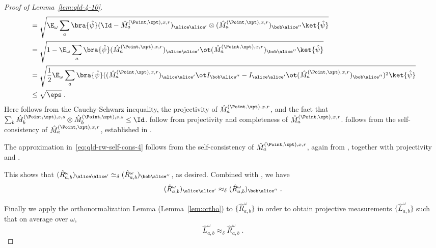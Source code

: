 \begin{proof}[Proof of Lemma~\ref{lem:qld-4-10}]
\begin{align}
                &= \sqrt{\E_\omega \sum_{a} \bra{\hat{\psi}} (\Id - \hat{M}^{(\Point,\xpt),x,r}_{a})_{\alice \alice'} \otimes (\hat{M}^{(\Point,\xpt),x,r}_{a})_{\bob \alice''} \ket{\hat{\psi}}} \label{eq:qld-rw-self-cons-3-2}\\
                &= \sqrt{ 1 - \E_{\omega} \sum_a \bra{\hat{\psi}} (\hat{M}^{(\Point,\xpt),x,r}_{a})_{\alice \alice'} \ot  (\hat{M}^{(\Point,\xpt),x,r}_{a})_{\bob \alice''} \ket{\hat{\psi}}} \label{eq:qld-rw-self-cons-3-3}\\
                &=\sqrt{ \frac{1}{2} \E_{\omega} \sum_a \bra{\hat{\psi}} ( (\hat{M}^{(\Point,\xpt),x,r}_{a})_{\alice \alice'} \ot I_{\bob \alice''} - I_{\alice \alice'} \ot  (\hat{M}^{(\Point,\xpt),x,r}_{a})_{\bob \alice''})^2 \ket{\hat{\psi}}} \label{eq:qld-rw-self-cons-3-4}\\
		&\leq \sqrt{\eps}\;. \label{eq:qld-rw-self-cons-3-5}
	\end{align}
	Here  follows from the Cauchy-Schwarz inequality, the projectivity of $\hat{M}^{(\Point,\xpt),x,r}_{a}$, and the fact that $\sum_b \hat{M}^{(\Point,\zpt),z,s}_{b} \otimes \hat{M}^{(\Point,\zpt),z,s}_{b} \leq \Id$.  follow from projectivity and completeness of $\hat{M}^{(\Point, \xpt), x, r}_{a}$.  follows from the self-consistency of $\hat{M}^{(\Point,\xpt),x,r}_{a}$, established in . 

        The approximation in~\eqref{eq:qld-rw-self-cons-4} follows from the self-consistency of $\hat{M}^{(\Point, \xpt), x, r}_a$, again from , together with projectivity and .

        
	
	This shows that $(\hat{R}^\omega_{a,b})_{\alice \alice'} \simeq_\delta (\hat{R}^\omega_{a,b})_{\bob \alice''}$, as desired. Combined with , we have
	\begin{equation}
		\label{eq:rw-sc}
		(\hat{R}^\omega_{a,b})_{\alice \alice'} \approx_\delta (\hat{R}^\omega_{a,b})_{\bob \alice''}\;.
	\end{equation}


		Finally we apply the orthonormalization Lemma (Lemma~\ref{lem:ortho}) to $\{ \hat{R}^\omega_{a,b} \}$ in order to obtain projective measurements $\{ \hat{L}^\omega_{a,b} \}$ such that on average over $\omega$,
	\begin{equation}\label{eq:rl-close}
		\hat{L}^\omega_{a,b} \approx_{\delta} \hat{R}^\omega_{a,b}\;.
	\end{equation}
	

\end{proof}
